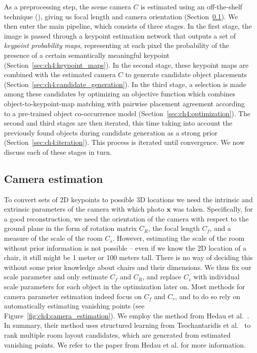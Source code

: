 \documentclass[10pt,twocolumn,letterpaper]{article}
\newcommand{\bb}[1]{{\bm{#1}}}
\begin{document}
As a preprocessing step, the scene camera $C$ is estimated using an
off-the-shelf technique (\cite{Hedau:2009:ICCV}), giving us focal length and
camera orientation (Section~\ref{sec:ch4:camera_estimation}). We then enter the
main pipeline, which consists of three stages. In the first stage, the image is
passed through a keypoint estimation network that outputs a set of
\emph{keypoint probability maps}, representing at each pixel the probability of
the presence of a certain semantically meaningful keypoint
(Section~\ref{sec:ch4:keypoint_maps}). In the second stage, these keypoint maps
are combined with the estimated camera $C$ to generate candidate object
placements (Section~\ref{sec:ch4:candidate_generation}). In the third stage, a
selection is made among these candidates by optimizing an objective function
which combines object-to-keypoint-map matching with pairwise placement agreement
according to a pre-trained object co-occurrence model
(Section~\ref{sec:ch4:optimization}). The second and third stages are then
iterated, this time taking into account the previously found objects during
candidate generation as a strong prior (Section~\ref{sec:ch4:iteration}). This
process is iterated until convergence. We now discuss each of these stages in
turn.

\subsection{Camera estimation}
\label{sec:ch4:camera_estimation}
To convert sets of 2D keypoints to possible 3D locations we need the intrinsic
and extrinsic parameters of the camera with which photo $\bb{x}$ was taken.
Specifically, for a good reconstruction, we need the orientation of the camera
with respect to the ground plane in the form of rotation matrix $C_R$, the
focal length $C_f$, and a measure of the scale of the room $C_s$.  However,
estimating the scale of the room without prior information is not possible -- even
if we know the 2D location of a chair, it still might be 1 meter or 100 meters tall. There is no way of deciding this
without some prior knowledge about chairs and their dimensions. We thus fix our
scale parameter and only estimate $C_f$ and $C_R$, and replace $C_s$ with
individual scale parameters for each object in the optimization later on.  Most
methods for camera parameter estimation indeed focus on $C_f$ and $C_r$, and to
do so rely on automatically estimating vanishing points (see
Figure~\ref{fig:ch4:camera_estimation}). We employ the method from Hedau et
al.~\cite{Hedau:2009:ICCV}. In summary, their method uses structured learning
from Tsochantaridis et al.~\cite{Tsochantaridis:2005:JMLR} to rank multiple
room layout candidates, which are generated from estimated vanishing points. We
refer to the paper from Hedau et al. for more information.
\end{document}
